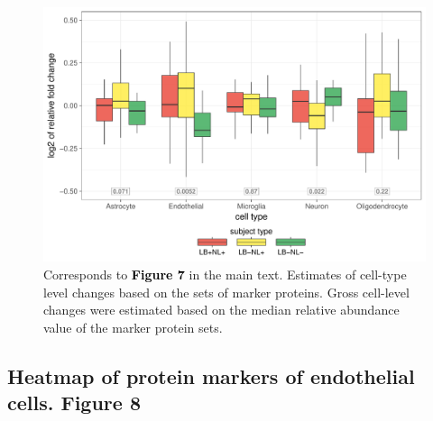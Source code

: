 \documentclass[11pt]{article}\usepackage[]{graphicx}\usepackage[usenames,dvipsnames]{color}
\newenvironment{knitrout}{}{} %
\begin{document}
\begin{figure}[h!]
\center
\begin{minipage}{0.8\textwidth}
\begin{knitrout}
\color{fgcolor}

{\centering \includegraphics[width=1\textwidth]{figure/cell_type_changes-1} 

}



\end{knitrout}
\caption{Corresponds to
\textcolor{black}{\colorbox{highlighter}{\textbf{Figure 7}}} in the main text.
Estimates of cell-type level changes based on the sets of marker proteins.
Gross cell-level changes were estimated based on the median relative abundance
value of the marker protein sets.}
\label{fig:CellTypes}
\end{minipage}
\end{figure}



\clearpage
\subsection{Heatmap of protein markers of endothelial cells. Figure 8}
\end{document}
